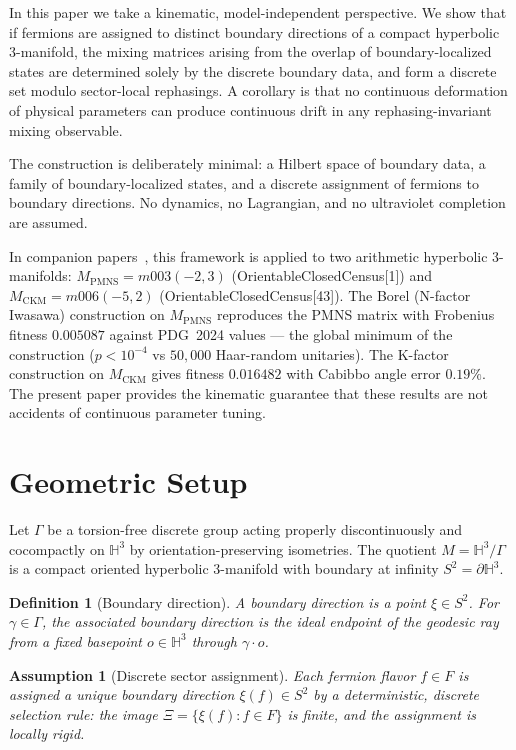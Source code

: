 \documentclass[11pt,a4paper]{article}
\newtheorem{definition}[theorem]{Definition}
\newtheorem{assumption}[theorem]{Assumption}
\begin{document}
In this paper we take a kinematic, model-independent perspective.
We show that if fermions are assigned to distinct boundary directions
of a compact hyperbolic 3-manifold, the mixing matrices arising from
the overlap of boundary-localized states are determined solely by the
discrete boundary data, and form a discrete set modulo sector-local
rephasings.
A corollary is that no continuous deformation of physical parameters
can produce continuous drift in any rephasing-invariant mixing observable.

The construction is deliberately minimal: a Hilbert space of boundary
data, a family of boundary-localized states, and a discrete assignment
of fermions to boundary directions.
No dynamics, no Lagrangian, and no ultraviolet completion are assumed.

In companion papers~\cite{Gentry:CKM,Gentry:PMNS}, this framework is
applied to two arithmetic hyperbolic 3-manifolds:
$M_{\mathrm{PMNS}}=m003(-2,3)$ (OrientableClosedCensus[1]) and
$M_{\mathrm{CKM}}=m006(-5,2)$ (OrientableClosedCensus[43]).
The Borel (N-factor Iwasawa) construction on
$M_{\mathrm{PMNS}}$ reproduces the PMNS matrix with Frobenius fitness
$0.005087$ against PDG~2024 values --- the global minimum of the
construction ($p<10^{-4}$ vs $50{,}000$ Haar-random unitaries).
The K-factor construction on $M_{\mathrm{CKM}}$ gives fitness
$0.016482$ with Cabibbo angle error $0.19\%$.
The present paper provides the kinematic guarantee that these results
are not accidents of continuous parameter tuning.

\section{Geometric Setup}
\label{sec:setup}

Let $\Gamma$ be a torsion-free discrete group acting properly
discontinuously and cocompactly on $\mathbb{H}^3$ by
orientation-preserving isometries.
The quotient $M=\mathbb{H}^3/\Gamma$ is a compact oriented
hyperbolic 3-manifold with boundary at infinity $S^2=\partial\mathbb{H}^3$.

\begin{definition}[Boundary direction]
A \emph{boundary direction} is a point $\xi\in S^2$.
For $\gamma\in\Gamma$, the associated boundary direction is the ideal
endpoint of the geodesic ray from a fixed basepoint $o\in\mathbb{H}^3$
through $\gamma\cdot o$.
\end{definition}

\begin{assumption}[Discrete sector assignment]
\label{ass:discrete}
Each fermion flavor $f\in F$ is assigned a unique boundary direction
$\xi(f)\in S^2$ by a deterministic, discrete selection rule: the image
$\Xi=\{\xi(f):f\in F\}$ is finite, and the assignment is locally rigid.
\end{assumption}
\end{document}
